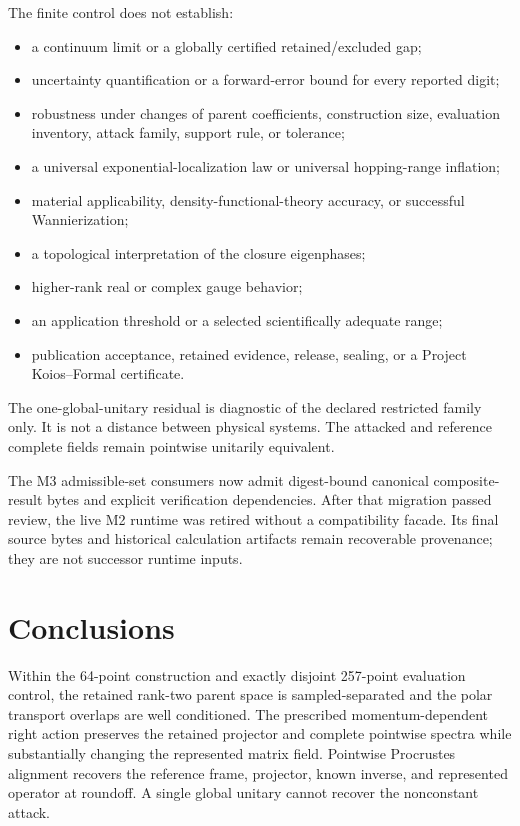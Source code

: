 \documentclass[11pt]{article}
\begin{document}
The finite control does not establish:
\begin{itemize}
 \item a continuum limit or a globally certified retained/excluded gap;
 \item uncertainty quantification or a forward-error bound for every reported digit;
 \item robustness under changes of parent coefficients, construction size, evaluation
       inventory, attack family, support rule, or tolerance;
 \item a universal exponential-localization law or universal hopping-range inflation;
 \item material applicability, density-functional-theory accuracy, or successful
       Wannierization;
 \item a topological interpretation of the closure eigenphases;
 \item higher-rank real or complex gauge behavior;
 \item an application threshold or a selected scientifically adequate range;
 \item publication acceptance, retained evidence, release, sealing, or a Project
       Koios--Formal certificate.
\end{itemize}
The one-global-unitary residual is diagnostic of the declared restricted family only.
It is not a distance between physical systems.  The attacked and reference complete
fields remain pointwise unitarily equivalent.

The M3 admissible-set consumers now admit digest-bound canonical composite-result
bytes and explicit verification dependencies.  After that migration passed review, the
live M2 runtime was retired without a compatibility facade.  Its final source bytes and
historical calculation artifacts remain recoverable provenance; they are not successor
runtime inputs.

\section{Conclusions}

Within the 64-point construction and exactly disjoint 257-point evaluation control, the
retained rank-two parent space is sampled-separated and the polar transport overlaps are
well conditioned.  The prescribed momentum-dependent right action preserves the
retained projector and complete pointwise spectra while substantially changing the
represented matrix field.  Pointwise Procrustes alignment recovers the reference frame,
projector, known inverse, and represented operator at roundoff.  A single global unitary
cannot recover the nonconstant attack.
\end{document}
